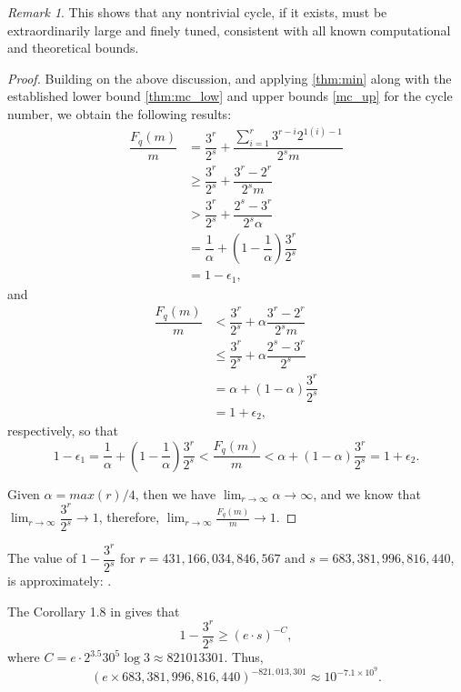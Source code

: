 \documentclass{amsart}
\theoremstyle{definition}
\theoremstyle{remark}
\newtheorem{remark}[theorem]{Remark}
\numberwithin{equation}{section}
\begin{document}
\begin{remark}
	This shows that any nontrivial cycle, if it exists, must be extraordinarily large and finely tuned, consistent with all known computational and theoretical bounds.
\end{remark}


\begin{proof}
	Building on the above discussion, and applying \autoref{thm:min} along with the established lower bound \autoref{thm:mc_low} and upper bounds \autoref{mc_up} for the cycle number, we obtain the following results:			
\begin{align*}
	\dfrac{F_q(m)}{m}&=\dfrac{3^r}{2^s} +\dfrac{\sum_{i=1}^r3^{r-i} 2^{1(i)-1}}{2^s m}\\ 
	&\geq\dfrac{3^r}{2^s} + \dfrac{3^{r}-2^{r}}{2^sm}\\
	&>\dfrac{3^r}{2^s} + \dfrac{2^{s}-3^{r}}{2^s\alpha}\\
	&=\dfrac{1}{\alpha} +(1-\dfrac{1}{\alpha})\dfrac{3^r}{2^s}\\
	&=1-\epsilon_1,
\end{align*}
and
\begin{align*}
\dfrac{F_q(m)}{m}&<\dfrac{3^r}{2^s} + \alpha\dfrac{3^{r}-2^{r}}{2^sm}\\
&\leq\dfrac{3^r}{2^s} + \alpha\dfrac{2^{s}-3^{r}}{2^s}\\
&=\alpha+(1-\alpha)\dfrac{3^r}{2^s}\\
&=1+\epsilon_2,
\end{align*}
respectively, so that $$ 1-\epsilon_1 = \dfrac{1}{\alpha} +(1-\dfrac{1}{\alpha})\dfrac{3^r}{2^s} < \frac{F_{q}(m)}{m}  <\alpha+(1-\alpha)\dfrac{3^r}{2^s} = 1+\epsilon_2.$$

Given $\alpha=max(r)/4$, then we have 
$\lim_{r \to \infty} \alpha \to \infty$, and we know that 
$\lim_{r \to \infty} \dfrac{3^r}{2^s} \to 1$, therefore,
$\lim_{r \to \infty} \tfrac{F_{q}(m)}{m} \to 1$. 

\end{proof}


The value of $1-\dfrac{3^{r}}{2^{s}}$ for $r = 431{,}166{,}034{,}846{,}567 \text{ and } s = 683{,}381{,}996{,}816{,}440$, is approximately: .	

The Corollary 1.8 in \cite{Ev11} gives that				
$$1-\dfrac{3^r}{2^s}\geq(e\cdot s)^{-C},$$
where $C=e\cdot2^{3.5}30^5\log3\approx821013301.$ Thus, 
$$ (e \times 683{,}381{,}996{,}816{,}440)^{-821{,}013{,}301} \approx \boxed{10^{-7.1 \times 10^9}}. $$
\end{document}

